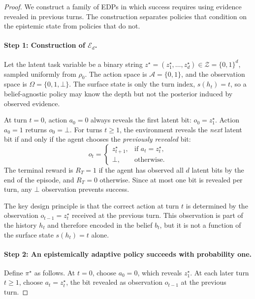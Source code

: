 \documentclass[11pt]{article}
\theoremstyle{plain}
\theoremstyle{definition}
\theoremstyle{remark}
\begin{document}
\begin{proof}
We construct a family of EDPs in which success requires using evidence 
revealed in previous turns. The construction separates policies that 
condition on the epistemic state from policies that do not.

\paragraph{Step 1: Construction of $\mathcal{E}_d$.}
Let the latent task variable be a binary string 
$z^\star = (z^\star_1, \ldots, z^\star_d) \in \mathcal{Z} = \{0,1\}^d$, 
sampled uniformly from $\rho_0$. The action space is $\mathcal{A} = \{0,1\}$, 
and the observation space is $\Omega = \{0,1,\bot\}$. The surface state 
is only the turn index, $s(h_t) = t$, so a belief-agnostic policy may 
know the depth but not the posterior induced by observed evidence.

At turn $t = 0$, action $a_0 = 0$ always reveals the first latent bit: 
$o_0 = z^\star_1$. Action $a_0 = 1$ returns $o_0 = \bot$.
For turns $t \geq 1$, the environment reveals the \emph{next} latent bit 
if and only if the agent chooses the \emph{previously revealed} bit:
\[
    o_t =
    \begin{cases}
        z^\star_{t+1}, & \text{if } a_t = z^\star_t, \\
        \bot,          & \text{otherwise.}
    \end{cases}
\]
The terminal reward is $R_T = 1$ if the agent has observed all $d$ latent 
bits by the end of the episode, and $R_T = 0$ otherwise. Since at most one 
bit is revealed per turn, any $\bot$ observation prevents success.

The key design principle is that the correct action at turn $t$ is 
determined by the observation $o_{t-1} = z^\star_t$ received at the 
previous turn. This observation is part of the history $h_t$ and therefore 
encoded in the belief $b_t$, but it is not a function of the surface state 
$s(h_t) = t$ alone.

\paragraph{Step 2: An epistemically adaptive policy succeeds with 
probability one.}
Define $\pi^\star$ as follows. At $t = 0$, choose $a_0 = 0$, which reveals 
$z^\star_1$. At each later turn $t \geq 1$, choose $a_t = z^\star_t$, 
the bit revealed as observation $o_{t-1}$ at the previous turn.


\end{proof}
\end{document}
